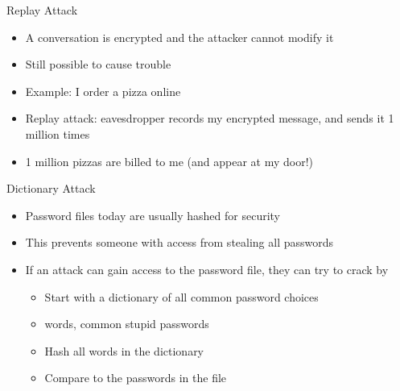 \begin{withoutheadline}
\begin{frame}{Replay Attack}
\begin{itemize}
    \item A conversation is encrypted and the attacker cannot modify it
    \item Still possible to cause trouble
    \item Example: I order a pizza online
    \item Replay attack: eavesdropper records my encrypted message, and sends it 1 million times
    \item 1 million pizzas are billed to me (and appear at my door!)
\end{itemize}
\end{frame}

\begin{frame}{Dictionary Attack}
\begin{itemize}
        \item Password files today are usually hashed for security
    \item This prevents someone with access from stealing all passwords
    \item If an attack can gain access to the password file, they can try to crack by
    \begin{itemize}
        \item Start with a dictionary of all common password choices
        \item words, common stupid passwords
        \item Hash all words in the dictionary
        \item Compare to the passwords in the file
    \end{itemize}
\end{itemize}
\end{frame}





\end{withoutheadline}
 
